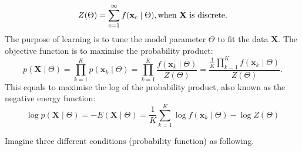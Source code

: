 \documentclass[11pt,twoside,a4paper]{article}
\begin{document}
	\begin{equation}
	\label{equ:z_dis}
	Z( \Theta) = \sum_{c=1}^{ \infty} f(\mathbf{x}_c \mid \Theta ), \text{when  $ \mathbf{X} $ is discrete.}
	\end{equation}
	The purpose of learning is to tune the model parameter $ \Theta $ to fit the data $ \mathbf{X}  $. 
	The objective function is to maximise the probability product:
	\begin{equation}
	 p(\mathbf{X} \mid \Theta ) = \prod_{k=1}^K p(\mathbf{x}_k \mid \Theta ) =  \prod_{k=1}^K\dfrac{f(\mathbf{x}_k \mid \Theta )}{Z( \Theta)}= \frac{\frac{1}{K}\prod_{k=1}^Kf(\mathbf{x}_k \mid \Theta )}{Z( \Theta)}.
	\end{equation}
	 This equals to maximise the log of the probability product, also known as the negative energy function:
	\begin{equation}
	\label{equ:energy}
	  \log p(\mathbf{X} \mid \Theta ) = -E(\mathbf{X} \mid \Theta )  =  \frac{1}{K}\sum_{k=1}^K\log f(\mathbf{x}_k \mid \Theta ) - \log Z( \Theta)
	\end{equation}
	
	Imagine three different conditions (probability function) as following.
	
\end{document}

